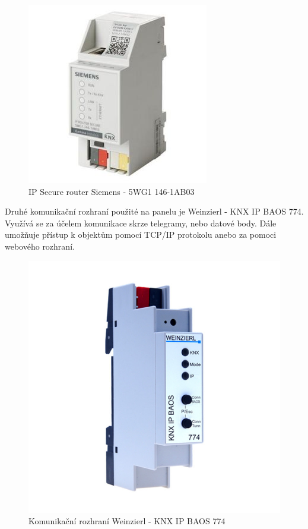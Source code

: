 \begin{figure}[!ht]
  \begin{center}
    \includegraphics[scale=0.55]{obrazky/Siemens router.jpg}
  \end{center}
  \caption[IP Secure router Siemens - 5WG1 146-1AB03 \cite{Siemens IP}]{IP Secure router Siemens - 5WG1 146-1AB03 \cite{Siemens IP}}
  \label{fig:IP Secure router Siemens - 5WG1 146-1AB03}
\end{figure}

Druhé komunikační rozhraní použité na panelu je Weinzierl - KNX IP BAOS 774. Využívá se za účelem komunikace skrze telegramy, nebo datové body. Dále umožňuje přístup k objektům pomocí TCP/IP protokolu anebo za pomoci webového rozhraní. \cite{Weinzier}

\begin{figure}[!ht]
  \begin{center}
    \includegraphics[scale=0.2]{obrazky/IP BAOS.jpg}
  \end{center}
  \caption[Komunikační rozhraní Weinzierl - KNX IP BAOS 774 \cite{Weinzier ob}]{Komunikační rozhraní Weinzierl - KNX IP BAOS 774 \cite{Weinzier ob}}
  \label{fig:Komunikační rozhraní Weinzierl - KNX IP BAOS 774}
\end{figure}

